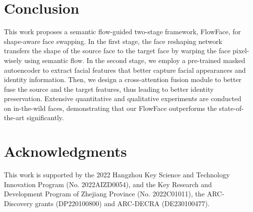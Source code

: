 \section{Conclusion}
This work proposes a semantic flow-guided two-stage framework, FlowFace, for shape-aware face swapping. 
In the first stage, the face reshaping network transfers the shape of the source face to the target face by warping the face pixel-wisely using semantic flow. In the second stage, we employ a pre-trained masked autoencoder to extract facial features that better capture facial appearances and identity information. Then, we design a cross-attention fusion module to better fuse the source and the target features, thus leading to better identity preservation. Extensive quantitative and qualitative experiments are conducted on in-the-wild faces, demonstrating that our FlowFace outperforms the state-of-the-art significantly. 

\section{Acknowledgments}
This work is supported by the 2022 Hangzhou Key Science and Technology Innovation Program (No. 2022AIZD0054), and the Key Research and Development Program of Zhejiang Province (No. 2022C01011), the ARC-Discovery grants (DP220100800) and ARC-DECRA (DE230100477).

\newpage

